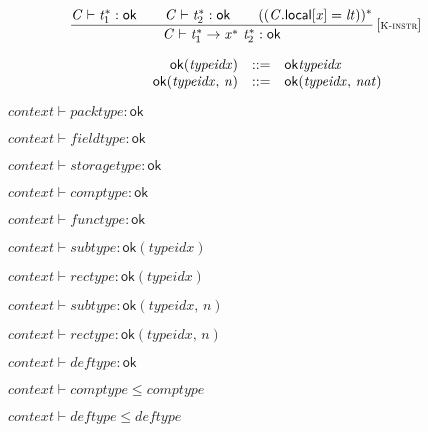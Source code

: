 $$
\begin{array}{@{}c@{}}\displaystyle
\frac{
{\mathit{C}} \vdash {{\mathit{t}}_{{1}}^\ast} : \mathsf{ok}
 \qquad
{\mathit{C}} \vdash {{\mathit{t}}_{{2}}^\ast} : \mathsf{ok}
 \qquad
(({\mathit{C}}.\mathsf{local}{}[{\mathit{x}}] = {\mathit{lt}}))^\ast
}{
{\mathit{C}} \vdash {{\mathit{t}}_{{1}}^\ast} \rightarrow {{\mathit{x}}^\ast}~{{\mathit{t}}_{{2}}^\ast} : \mathsf{ok}
} \, {[\textsc{\scriptsize K{-}instr}]}
\qquad
\end{array}
$$

\vspace{1ex}

$$
\begin{array}{@{}lrrl@{}l@{}}
& {\mathsf{ok}}{({\mathit{typeidx}})} &::=& {\mathsf{ok}}{{\mathit{typeidx}}} \\
& {\mathsf{ok}}{({\mathit{typeidx}},\, {\mathit{n}})} &::=& {\mathsf{ok}}{({\mathit{typeidx}},\, {\mathit{nat}})} \\
\end{array}
$$

$\boxed{{\mathit{context}} \vdash {\mathit{packtype}} : \mathsf{ok}}$

$\boxed{{\mathit{context}} \vdash {\mathit{fieldtype}} : \mathsf{ok}}$

$\boxed{{\mathit{context}} \vdash {\mathit{storagetype}} : \mathsf{ok}}$

$\boxed{{\mathit{context}} \vdash {\mathit{comptype}} : \mathsf{ok}}$

$\boxed{{\mathit{context}} \vdash {\mathit{functype}} : \mathsf{ok}}$

$\boxed{{\mathit{context}} \vdash {\mathit{subtype}} : {\mathsf{ok}}{({\mathit{typeidx}})}}$

$\boxed{{\mathit{context}} \vdash {\mathit{rectype}} : {\mathsf{ok}}{({\mathit{typeidx}})}}$

$\boxed{{\mathit{context}} \vdash {\mathit{subtype}} : {\mathsf{ok}}{({\mathit{typeidx}},\, {\mathit{n}})}}$

$\boxed{{\mathit{context}} \vdash {\mathit{rectype}} : {\mathsf{ok}}{({\mathit{typeidx}},\, {\mathit{n}})}}$

$\boxed{{\mathit{context}} \vdash {\mathit{deftype}} : \mathsf{ok}}$

$\boxed{{\mathit{context}} \vdash {\mathit{comptype}} \leq {\mathit{comptype}}}$

$\boxed{{\mathit{context}} \vdash {\mathit{deftype}} \leq {\mathit{deftype}}}$

\vspace{1ex}

